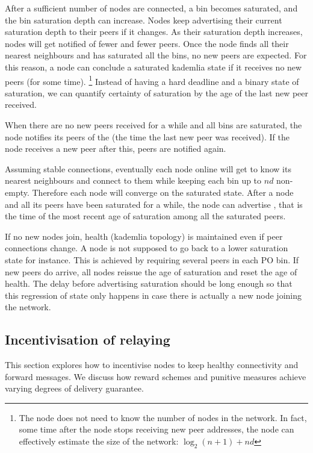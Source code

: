 After a sufficient number of nodes are connected, a bin becomes saturated, and the bin saturation depth can increase.
Nodes keep advertising their current saturation depth to their peers if it changes. 
As their saturation depth increases, nodes will get notified of fewer and fewer peers. Once the node finds all their nearest neighbours and has saturated all the bins, no new peers are expected. For this reason, a node can conclude  a saturated kademlia state if it receives no new peers (for some time).%
%
\footnote{The node does not need to know the number of nodes in the network. In fact, some time after the node stops receiving new peer addresses, the node can effectively estimate the size of the network: $\log_2(n+1)+ nd$}
%
Instead of having a hard deadline and a binary state of
saturation, we can quantify certainty of saturation by the age of the last new peer received.

When there are no new peers received for a while and all bins are saturated, the node notifies its peers of the  (the time the last new peer was received). If the node receives a new peer after this, peers are notified again.

Assuming stable connections, eventually each node online will get to know its nearest neighbours and connect to them while keeping each bin up to $nd$ non-empty. Therefore each node will converge on the saturated state. 
After a node and all its peers have been saturated for a while, the node can advertise , 
that is the time of the most recent age of saturation among all the saturated peers. 

If no new nodes join, health (kademlia topology) is maintained even if peer connections change. A node is not supposed to go back to a lower saturation state for instance. This is achieved by requiring several peers in each PO bin. 
If new peers do arrive, all nodes reissue the age of saturation and reset the age of health. The delay before advertising saturation should be long enough so that this regression of state only happens in case there is actually a new node joining the network.


\subsection{Incentivisation of relaying}

This section explores how to incentivise nodes to keep healthy connectivity and forward messages. We discuss how reward schemes and punitive measures achieve varying degrees of delivery guarantee.

